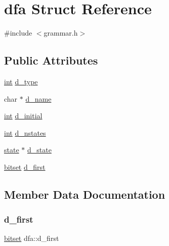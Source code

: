 \hypertarget{structdfa}{}\section{dfa Struct Reference}
\label{structdfa}


{\ttfamily \#include $<$grammar.\+h$>$}

\subsection*{Public Attributes}
\begin{DoxyCompactItemize}
\item 
\mbox{\hyperlink{warnings_8h_a74f207b5aa4ba51c3a2ad59b219a423b}{int}} \mbox{\hyperlink{structdfa_a69ef1e4934ea32fd079f99bcd8018946}{d\+\_\+type}}
\item 
char $\ast$ \mbox{\hyperlink{structdfa_a714ab213ebbb5228584fe7593399e038}{d\+\_\+name}}
\item 
\mbox{\hyperlink{warnings_8h_a74f207b5aa4ba51c3a2ad59b219a423b}{int}} \mbox{\hyperlink{structdfa_a5e8fc3fd1cb02df885c177bd234c9475}{d\+\_\+initial}}
\item 
\mbox{\hyperlink{warnings_8h_a74f207b5aa4ba51c3a2ad59b219a423b}{int}} \mbox{\hyperlink{structdfa_ab53253e48bbb638e9bb9cb9ca744004b}{d\+\_\+nstates}}
\item 
\mbox{\hyperlink{structstate}{state}} $\ast$ \mbox{\hyperlink{structdfa_aa70e502038acab62cce1c115f71cba7b}{d\+\_\+state}}
\item 
\mbox{\hyperlink{bitset_8h_ac7e27e031c9c878d9fc78425c9724038}{bitset}} \mbox{\hyperlink{structdfa_ad650d40c7f33bf9556eda163df616d20}{d\+\_\+first}}
\end{DoxyCompactItemize}


\subsection{Member Data Documentation}
\mbox{\label{structdfa_ad650d40c7f33bf9556eda163df616d20}} 
\subsubsection{\texorpdfstring{d\_first}{d\_first}}
{\footnotesize\ttfamily \mbox{\hyperlink{bitset_8h_ac7e27e031c9c878d9fc78425c9724038}{bitset}} dfa\+::d\+\_\+first}

\mbox{\label{structdfa_a5e8fc3fd1cb02df885c177bd234c9475}} 
